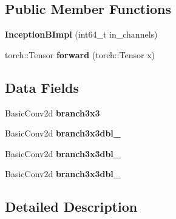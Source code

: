 \subsection*{Public Member Functions}
\begin{DoxyCompactItemize}
\item 
\mbox{\label{structvision_1_1models_1_1__inceptionimpl_1_1InceptionBImpl_ad18a5c91602c2f3c32e14d867fc98e5a}} 
{\bfseries Inception\+B\+Impl} (int64\+\_\+t in\+\_\+channels)
\item 
\mbox{\label{structvision_1_1models_1_1__inceptionimpl_1_1InceptionBImpl_a74fe0cbcbad040c2a917968b7258c31c}} 
torch\+::\+Tensor {\bfseries forward} (torch\+::\+Tensor x)
\end{DoxyCompactItemize}
\subsection*{Data Fields}
\begin{DoxyCompactItemize}
\item 
\mbox{\label{structvision_1_1models_1_1__inceptionimpl_1_1InceptionBImpl_a7b76dfc837f3526200a53c5b1bbad10b}} 
Basic\+Conv2d {\bfseries branch3x3}
\item 
\mbox{\label{structvision_1_1models_1_1__inceptionimpl_1_1InceptionBImpl_ac320a69b3f42caefe5fad3c2e3d2dba5}} 
Basic\+Conv2d {\bfseries branch3x3dbl\+\_}
\item 
\mbox{\label{structvision_1_1models_1_1__inceptionimpl_1_1InceptionBImpl_a76c6f5184d005a525572dfe2336be067}} 
Basic\+Conv2d {\bfseries branch3x3dbl\+\_}
\item 
\mbox{\label{structvision_1_1models_1_1__inceptionimpl_1_1InceptionBImpl_a12f2045a9dd89e3377c94082fac8e0a1}} 
Basic\+Conv2d {\bfseries branch3x3dbl\+\_}
\end{DoxyCompactItemize}


\subsection{Detailed Description}


